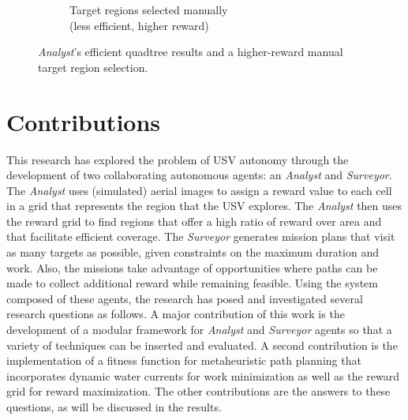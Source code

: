 \documentclass{tamuccthesis}
\begin{document}
\begin{figure}[H]
\begin{subfigure}[b]{0.475\textwidth}
        \caption{Target regions selected manually \\ (less efficient, higher reward)}   
        \label{fig:quadtree_b}
    \end{subfigure}
    \caption[Quadtree algorithm: efficient but sub-optimal.]{\textit{Analyst}'s efficient quadtree results and a higher-reward manual target region selection.}
    \label{fig:quadtree_compare}
\end{figure}

\section{Contributions}
\label{section:contributions}

This research has explored the problem of USV autonomy through the development of two collaborating autonomous agents: an \textit{Analyst} and \textit{Surveyor}. The \textit{Analyst} uses (simulated) aerial images to assign a reward value to each cell in a grid that represents the region that the USV explores. The \textit{Analyst} then uses the reward grid to find regions that offer a high ratio of reward over area and that facilitate efficient coverage. The \textit{Surveyor} generates mission plans that visit as many targets as possible, given constraints on the maximum duration and work. Also, the missions take advantage of opportunities where paths can be made to collect additional reward while remaining feasible. Using the system composed of these agents, the research has posed and investigated several research questions as follows. A major contribution of this work is the development of a modular framework for \textit{Analyst} and \textit{Surveyor} agents so that a variety of techniques can be inserted and evaluated. A second contribution is the implementation of a fitness function for metaheuristic path planning that incorporates dynamic water currents for work minimization as well as the reward grid for reward maximization. The other contributions are the answers to these questions, as will be discussed in the results. 
\end{document}
